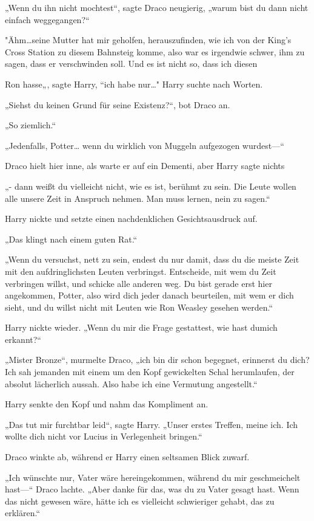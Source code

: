 {„Wenn du ihn nicht mochtest“, sagte Draco neugierig, „warum bist du dann nicht einfach weggegangen?“

"Ähm…seine Mutter hat mir geholfen, herauszufinden, wie ich von der King's Cross Station zu diesem Bahnsteig komme, also war es irgendwie schwer, ihm zu sagen, dass er verschwinden soll. Und es ist nicht so, dass ich diesen

Ron hasse„, sagte Harry, “ich habe nur…" Harry suchte nach Worten.

„Siehst du keinen Grund für seine Existenz?“, bot Draco an.

„So ziemlich.“

„Jedenfalls, Potter… wenn du wirklich von Muggeln aufgezogen wurdest—“

Draco hielt hier inne, als warte er auf ein Dementi, aber Harry sagte nichts

„- dann weißt du vielleicht nicht, wie es ist, berühmt zu sein. Die Leute wollen alle unsere Zeit in Anspruch nehmen. Man muss lernen, nein zu sagen.“

Harry nickte und setzte einen nachdenklichen Gesichtsausdruck auf.

„Das klingt nach einem guten Rat.“

„Wenn du versuchst, nett zu sein, endest du nur damit, dass du die meiste Zeit mit den aufdringlichsten Leuten verbringst. Entscheide, mit wem du Zeit verbringen willst, und schicke alle anderen weg. Du bist gerade erst hier angekommen, Potter, also wird dich jeder danach beurteilen, mit wem er dich sieht, und du willst nicht mit Leuten wie Ron Weasley gesehen werden.“

Harry nickte wieder. „Wenn du mir die Frage gestattest, wie hast dumich erkannt?“

„Mister Bronze“, murmelte Draco, „ich bin dir schon begegnet, erinnerst du dich? Ich sah jemanden mit einem um den Kopf gewickelten Schal herumlaufen, der absolut lächerlich aussah. Also habe ich eine Vermutung angestellt.“

Harry senkte den Kopf und nahm das Kompliment an.

„Das tut mir furchtbar leid“, sagte Harry. „Unser erstes Treffen, meine ich. Ich wollte dich nicht vor Lucius in Verlegenheit bringen.“

Draco winkte ab, während er Harry einen seltsamen Blick zuwarf.

„Ich wünschte nur, Vater wäre hereingekommen, während du mir geschmeichelt hast—“ Draco lachte. „Aber danke für das, was du zu Vater gesagt hast. Wenn das nicht gewesen wäre, hätte ich es vielleicht schwieriger gehabt, das zu erklären.“

}

